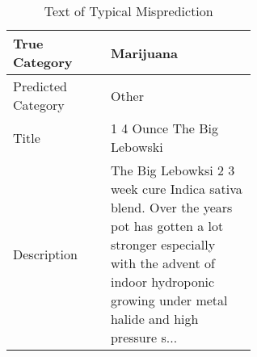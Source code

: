 \begin{table}[!ht]
    \begin{center}
        \begin{tabular}{| l | p{0.6\linewidth} |}
        \hline
        True Category & Marijuana \\
        \hline
        Predicted Category & Other \\
        \hline
        Title & 1 4 Ounce The Big Lebowski \\
        \hline
        Description & The Big Lebowksi 2 3 week cure Indica sativa blend. Over the years pot has gotten a lot stronger especially with the advent of indoor hydroponic growing under metal halide and high pressure s...\\
        \hline
        \end{tabular}
    \end{center}
    \caption{Text of Typical Misprediction}
    \label{misclassified}
\end{table}
